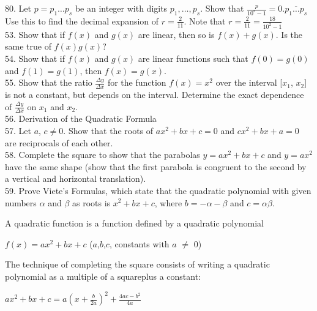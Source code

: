 \documentclass{article}
\begin{document}
\newpage

80. Let $p = p_1 \dots p_s$ be an integer with digits $p_1, \dots, p_s$. Show that $\frac{p}{10^s - 1} = 0.\overline{p_1 \dots p_s}$ Use this to find the decimal expansion of $r = \frac{2}{11}$. Note that $r = \frac{2}{11} = \frac{18}{10^2 - 1}$\\

53. Show that if $f(x)$ and $g(x)$ are linear, then so is $f(x) + g(x)$. Is the same true of $f(x)g(x)$?\\

54. Show that if $f(x)$ and $g(x)$ are linear functions such that $f(0) = g(0)$ and $f(1) = g(1)$, then $f(x) = g(x)$.\\

55. Show that the ratio $\frac{\Delta y}{\Delta x}$ for the function $f(x) = x^2$ over the interval [$x_1$, $x_2$] is not a constant, but depends on the interval. Determine the exact dependence of $\frac{\Delta y}{\Delta x}$ on $x_1$ and $x_2$.\\

56.  Derivation of the Quadratic Formula\\

57. Let $a$, $c \neq 0$. Show that the roots of $ax^2 + bx + c = 0$ and $cx^2 + bx + a = 0$ are reciprocals of each other.\\

58. Complete the square to show that the parabolas $y = ax^2 + bx + c$ and $y = ax^2$ have the same shape (show that the first parabola is congruent to the second by a vertical and horizontal translation).\\

59. Prove Viete's Formulas, which state that the quadratic polynomial with given numbers $\alpha$ and $\beta$ as roots is $x^2 + bx + c$, where $b = -\alpha - \beta$ and $c = \alpha\beta$.

\newpage

A quadratic function is a function defined by a quadratic polynomial\\
\begin{center}$f(x) = ax^2 + bx + c$ ($a$,$b$,$c$, constants with $a$ $\neq$ 0)\\\end{center}

The technique of completing the square consists of writing a quadratic polynomial as a multiple of a squareplus a constant:\\
\begin{center}$ax^2 + bx + c = a(x + \frac{b}{2a})^2 + \frac{4ac-b^2}{4a}$\\\end{center}
\end{document}
